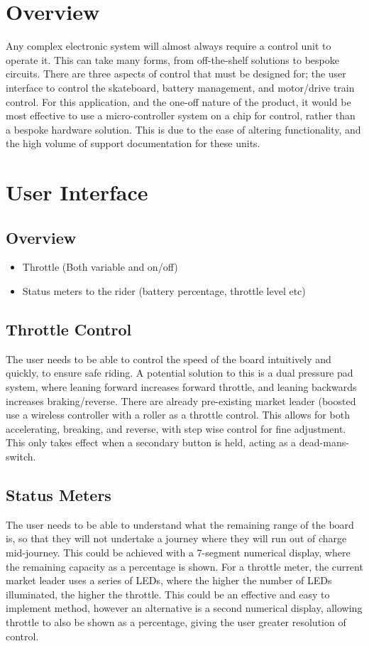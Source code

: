 \documentclass[journal,10pt]{IEEEtran}
\begin{document}
\section{Overview}
	Any complex electronic system will almost always require a control unit to operate it. 
	This can take many forms, from off-the-shelf solutions to bespoke circuits.
	There are three aspects of control that must be designed for; the user interface to control the skateboard, battery management, and motor/drive train control.
	For this application, and the one-off nature of the product, it would be most effective to use a micro-controller system on a chip for control, rather than a bespoke hardware solution.
	This is due to the ease of altering functionality, and the high volume of support documentation for these units.
\section{User Interface}
	\subsection{Overview}
		\begin{itemize}
			\item Throttle (Both variable and on/off)
			\item Status meters to the rider (battery percentage, throttle level etc)
		\end{itemize}
	\subsection{Throttle Control}
		The user needs to be able to control the speed of the board intuitively and quickly, to ensure safe riding.
		A potential solution to this is a dual pressure pad system, where leaning forward increases forward throttle, and leaning backwards increases braking/reverse.
		There are already pre-existing market leader (boosted use a wireless controller with a roller as a throttle control. 
		This allows for both accelerating, breaking, and reverse, with step wise control for fine adjustment.
		This only takes effect when a secondary button is held, acting as a dead-mans-switch.
	\subsection{Status Meters}
		The user needs to be able to understand what the remaining range of the board is, so that they will not undertake a journey where they will run out of charge mid-journey.
		This could be achieved with a 7-segment numerical display, where the remaining capacity as a percentage is shown.
		For a throttle meter, the current market leader uses a series of LEDs, where the higher the number of LEDs illuminated, the higher the throttle.
		This could be an effective and easy to implement method, however an alternative is a second numerical display, allowing throttle to also be shown as a percentage, giving the user greater resolution of control.
\end{document}
